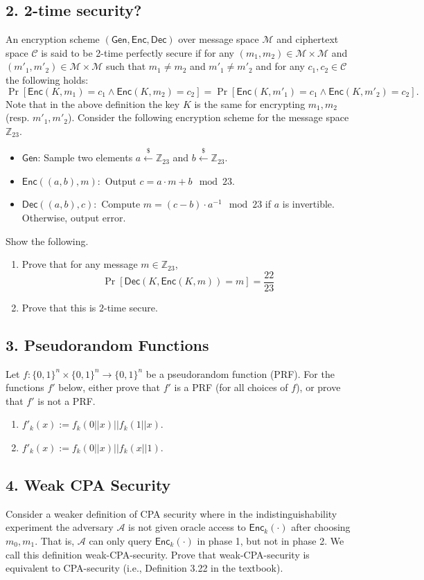 \documentclass[11pt]{article}
\newcommand{\Gen}{\mathsf{Gen}}
\newcommand{\Enc}{\mathsf{Enc}}
\newcommand{\Dec}{\mathsf{Dec}}
\newcommand{\Z}{\mathbb{Z}}
\newcommand{\getsr}{\stackrel{\$}{\gets}}
\newcommand{\A}{\mathcal{A}}
\newcommand{\bin}{\{0,1\}}
\newcommand{\bit}{\bin}
\begin{document}
\subsection*{2. 2-time security?}
An encryption scheme $(\Gen,\Enc,\Dec)$ over message space $\mathcal{M}$ and ciphertext space $\mathcal{C}$ is said to be 2-time perfectly secure if for any $(m_1,m_2) \in \mathcal{M} \times \mathcal{M}$ and $(m'_1,m'_2) \in \mathcal{M} \times \mathcal{M}$ such that $m_1 \neq m_2$ and $m'_1 \neq m'_2$ and for any $c_1,c_2 \in \mathcal{C}$ the following holds:
$$
\Pr[\Enc(K,m_1) = c_1 \wedge \Enc(K,m_2) = c_2] = \Pr[\Enc(K,m'_1) = c_1 \wedge \Enc(K,m'_2) = c_2].
$$
Note that in the above definition the key $K$ is the same for encrypting $m_1,m_2$ (resp. $m'_1,m'_2$).
Consider the following encryption scheme for the message space $\Z_{23}$.
\begin{itemize}
    \item $\Gen$: Sample two elements $a \getsr \Z_{23} $ and $b \getsr \Z_{23}$.
    \item $\Enc((a,b),m):$ Output $c = a\cdot m + b \mod 23$.
    \item $\Dec((a,b),c):$ Compute $m = (c - b) \cdot a^{-1} \mod 23$ if $a$ is invertible. Otherwise, output error.
\end{itemize}
Show the following.
\begin{enumerate}
    \item Prove that for any message $m \in \Z_{23}$,
    $$
    \Pr[\Dec(K,\Enc(K,m)) = m] = \frac{22}{23}
    $$
    \item Prove that this is $2$-time secure.
\end{enumerate}

\subsection*{3. Pseudorandom Functions}
Let $f: \bit^n \times \bit^n \rightarrow \bit^n$ be a pseudorandom function (PRF). For the functions $f'$ below, either prove that $f'$ is a PRF (for all choices of $f$), or prove that $f'$ is not a PRF.
\begin{enumerate}[label=(\alph*)]
\item $f'_k(x):= f_k(0||x) || f_k(1||x)$.
\item $f'_k(x):= f_k(0||x) || f_k(x||1)$.
\end{enumerate}

\subsection*{4. Weak CPA Security}
Consider a weaker definition of CPA security where in the indistinguishability experiment the adversary $\A$ is not given oracle access to $\Enc_k(\cdot)$ after choosing $m_0, m_1$. That is, $\A$ can only query $\Enc_k(\cdot)$ in phase 1, but not in phase 2. We call this definition weak-CPA-security.
Prove that weak-CPA-security is equivalent to CPA-security (i.e., Definition 3.22 in the textbook).\\
\end{document}
